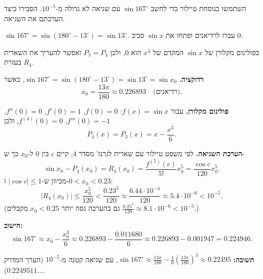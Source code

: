 
\begin{question}
השתמשו בנוסחת טיילור כדי לחשב $\sin 167^\circ$ עם שגיאה לא גדולה מ-$10^{-5}$. הסבירו כיצד הערכתם את השגיאה.
\end{question}

\begin{hint}
$\sin167^\circ=\sin(180^\circ-13^\circ)=\sin13^\circ$. עברו לרדיאנים ופתחו את $\sin x$ סביב $0$.
\end{hint}

\begin{hint}
בפולינום מקלורן של $\sin x$ המקדם של $x^4$ הוא $0$, ולכן $P_3=P_4$ ואפשר להעריך את השארית בעזרת $R_4$.
\end{hint}

\begin{solution}
\textbf{רדוקציה.} $\sin167^\circ=\sin(180^\circ-13^\circ)=\sin13^\circ=\sin x_0$, כאשר
\[
x_0=\frac{13\pi}{180}\approx0.226893 \quad\text{(רדיאנים)}.
\]

\textbf{פולינום מקלורן.} עבור $f(x)=\sin x$: $f(0)=0$, $f'(0)=1$, $f''(0)=0$, $f'''(0)=-1$, $f^{(4)}(0)=0$, ולכן
\[
P_4(x)=P_3(x)=x-\frac{x^3}{6}.
\]

\textbf{הערכת השגיאה.} לפי משפט טיילור עם שארית לגרנז' מסדר $4$, קיים $c$ בין $0$ ל-$x_0$ כך ש-
\[
\sin x_0-P_4(x_0)=R_4(x_0)=\frac{f^{(5)}(c)}{5!}x_0^5=\frac{\cos c}{120}x_0^5 .
\]
מכיוון ש-$|\cos c|\le1$ ו-$0<x_0<0.23$:
\[
|R_4(x_0)|\le\frac{x_0^5}{120}<\frac{0.23^5}{120}\approx\frac{6.44\cdot10^{-4}}{120}\approx5.4\cdot10^{-6}<10^{-5}.
\]
(גם בהערכה גסה יותר $x_0<0.25$ מקבלים $\frac{0.25^5}{120}\approx8.1\cdot10^{-6}<10^{-5}$.)

\textbf{חישוב:}
\[
\sin167^\circ\approx x_0-\frac{x_0^3}{6}\approx0.226893-\frac{0.011680}{6}\approx0.226893-0.001947=0.224946.
\]

\textbf{תשובה:} $\sin167^\circ\approx\frac{13\pi}{180}-\frac16\left(\frac{13\pi}{180}\right)^3\approx0.22495$, עם שגיאה קטנה מ-$10^{-5}$ (הערך המדויק $0.2249511\ldots$).
\end{solution}

